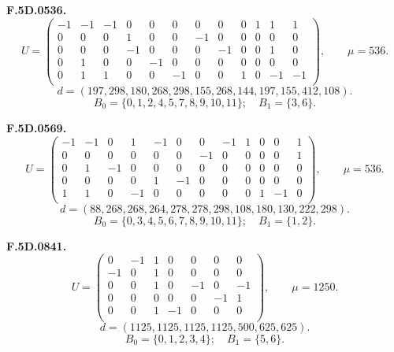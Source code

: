\par\medskip\noindent\begin{minipage}{\linewidth}\textbf{F.5D.0536.}
\begingroup\small\setlength{\arraycolsep}{3pt}
\[U=\begin{pmatrix}
-1 & -1 & -1 & 0 & 0 & 0 & 0 & 0 & 0 & 1 & 1 & 1\\
0 & 0 & 0 & 1 & 0 & 0 & -1 & 0 & 0 & 0 & 0 & 0\\
0 & 0 & 0 & -1 & 0 & 0 & 0 & -1 & 0 & 0 & 1 & 0\\
0 & 1 & 0 & 0 & -1 & 0 & 0 & 0 & 0 & 0 & 0 & 0\\
0 & 1 & 1 & 0 & 0 & -1 & 0 & 0 & 1 & 0 & -1 & -1\\
\end{pmatrix},\qquad \mu=536.\]
\[d=(197,298,180,268,298,155,268,144,197,155,412,108).\]
\[B_0=\{0,1,2,4,5,7,8,9,10,11\};\quad B_1=\{3,6\}.\]
\endgroup\end{minipage}\par
\par\medskip\noindent\begin{minipage}{\linewidth}\textbf{F.5D.0569.}
\begingroup\small\setlength{\arraycolsep}{3pt}
\[U=\begin{pmatrix}
-1 & -1 & 0 & 1 & -1 & 0 & 0 & -1 & 1 & 0 & 0 & 1\\
0 & 0 & 0 & 0 & 0 & 0 & -1 & 0 & 0 & 0 & 0 & 1\\
0 & 1 & -1 & 0 & 0 & 0 & 0 & 0 & 0 & 0 & 0 & 0\\
0 & 0 & 0 & 0 & 1 & -1 & 0 & 0 & 0 & 0 & 0 & 0\\
1 & 1 & 0 & -1 & 0 & 0 & 0 & 0 & 0 & 1 & -1 & 0\\
\end{pmatrix},\qquad \mu=536.\]
\[d=(88,268,268,264,278,278,298,108,180,130,222,298).\]
\[B_0=\{0,3,4,5,6,7,8,9,10,11\};\quad B_1=\{1,2\}.\]
\endgroup\end{minipage}\par
\par\medskip\noindent\begin{minipage}{\linewidth}\textbf{F.5D.0841.}
\begingroup\small\setlength{\arraycolsep}{3pt}
\[U=\begin{pmatrix}
0 & -1 & 1 & 0 & 0 & 0 & 0\\
-1 & 0 & 1 & 0 & 0 & 0 & 0\\
0 & 0 & 1 & 0 & -1 & 0 & -1\\
0 & 0 & 0 & 0 & 0 & -1 & 1\\
0 & 0 & 1 & -1 & 0 & 0 & 0\\
\end{pmatrix},\qquad \mu=1250.\]
\[d=(1125,1125,1125,1125,500,625,625).\]
\[B_0=\{0,1,2,3,4\};\quad B_1=\{5,6\}.\]
\endgroup\end{minipage}\par
